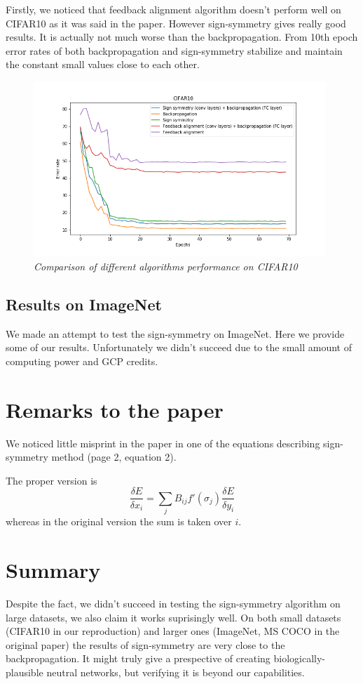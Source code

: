 \documentclass{article} %
\begin{document}
Firstly, we noticed that feedback alignment algorithm doesn't perform well on CIFAR10 as it was said in the paper. However sign-symmetry gives really good results. It is actually not much worse than the backpropagation. From 10th epoch error rates of both backpropagation and sign-symmetry stabilize and maintain the constant small values close to each other.
\newpage
\begin{figure}[h]
	\centering
	\includegraphics[width=11cm]{CIFAR10_results.png}
	\caption{\textit{Comparison of different algorithms performance on CIFAR10}}
\end{figure}

\subsection{Results on ImageNet}
We made an attempt to test the sign-symmetry on ImageNet. Here we provide some of our results. Unfortunately we didn't succeed due to the small amount of computing power and GCP credits. 


\section{Remarks to the paper}
We noticed little misprint in the paper in one of the equations describing sign-symmetry method (page 2, equation 2).

The proper version is
$$
\frac{\delta E}{\delta x_i} = \sum_j B_{ij}f'(\sigma_j)\frac{\delta E}{\delta{y_i}}
$$ 
whereas in the original version the sum is taken over $i$.

\section{Summary}
Despite the fact, we didn't succeed in testing the sign-symmetry algorithm on large datasets, we also claim it works suprisingly well. On both small datasets (CIFAR10 in our reproduction) and larger ones (ImageNet, MS COCO in the original paper) the results of sign-symmetry are very close to the backpropagation. It might truly give a prespective of creating biologically-plausible neutral networks, but verifying it is beyond our capabilities.








\end{document}
